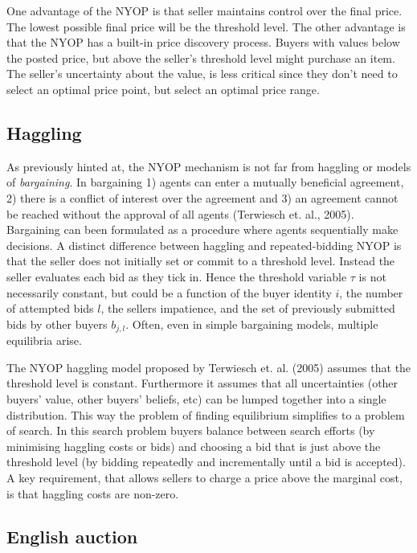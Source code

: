 \documentclass[a4paper,12pt]{article}
\begin{document}
	One advantage of the NYOP is that seller maintains control over the final price. The lowest possible final price will be the threshold level. The other advantage is that the NYOP has a built-in price discovery process. Buyers with values below the posted price, but above the seller's threshold level might purchase an item. The seller's uncertainty about the value, is less critical since they don't need to select an optimal price point, but select an optimal price range.

	\subsection{Haggling}

	As previously hinted at, the NYOP mechanism is not far from haggling or models of {\it bargaining}. In bargaining 1) agents can enter a mutually beneficial agreement, 2) there is a conflict of interest over the agreement and 3) an agreement cannot be reached without the approval of all agents (Terwiesch et. al., 2005). Bargaining can been formulated as a procedure where agents sequentially make decisions. A distinct difference between haggling and repeated-bidding NYOP is that the seller does not initially set or commit to a threshold level. Instead the seller evaluates each bid as they tick in. Hence the threshold variable $\tau$ is not necessarily constant, but could be a function of the buyer identity $i$, the number of attempted bids $l$, the sellers impatience, and the set of previously submitted bids by other buyers $b_{j,l}$. Often, even in simple bargaining models, multiple equilibria arise.

	The NYOP haggling model proposed by Terwiesch et. al. (2005) assumes that the threshold level is constant. Furthermore it assumes that all uncertainties (other buyers' value, other buyers' beliefs, etc) can be lumped together into a single distribution. This way the problem of finding equilibrium simplifies to a problem of search. In this search problem buyers balance between search efforts (by minimising haggling costs or bids) and choosing a bid that is just above the threshold level (by bidding repeatedly and incrementally until a bid is accepted). A key requirement, that allows sellers to charge a price above the marginal cost, is that haggling costs are non-zero.

	\subsection{English auction}
\end{document}
